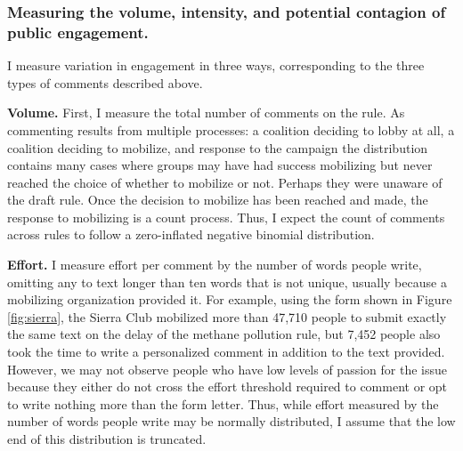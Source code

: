 
% 





\subsubsection{Measuring the volume, intensity, and potential contagion of public engagement.}

I measure variation in engagement in three ways, corresponding to the three types of comments described above. 

\textbf{Volume.} 
First, I measure the total number of comments on the rule. As commenting results from multiple processes: a coalition deciding to lobby at all, a coalition deciding to mobilize, and response to the campaign the distribution contains many cases where groups may have had success mobilizing but never reached the choice of whether to mobilize or not. Perhaps they were unaware of the draft rule. Once the decision to mobilize has been reached and made, the response to mobilizing is a count process. Thus, I expect the count of comments across rules to follow a zero-inflated negative binomial distribution. %

\textbf{Effort.} I measure effort per comment by the number of words people write, omitting any to text longer than ten words that is not unique, usually because a mobilizing organization provided it. %
For example, using the form shown in Figure \ref{fig:sierra}, the Sierra Club mobilized more than 47,710 people to submit exactly the same text on the delay of the methane pollution rule, but 7,452 people also took the time to write a personalized comment in addition to the text provided. However, we may not observe people who have low levels of passion for the issue because they either do not cross the effort threshold required to comment or opt to write nothing more than the form letter. Thus, while effort measured by the number of words people write may be normally distributed, I assume that the low end of this distribution is truncated.

